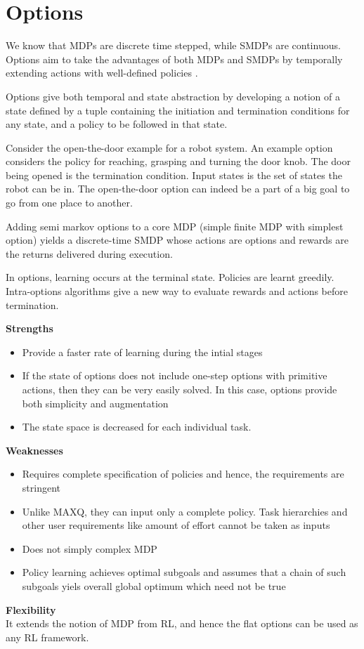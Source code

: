 \section{Options}

We know that MDPs are discrete time stepped, while SMDPs are continuous.
Options aim to take the advantages of both MDPs and SMDPs by temporally
extending actions with well-defined policies \cite{Sutton}.

Options give both temporal and state abstraction by developing a notion of a
state defined by a tuple containing the initiation and termination
conditions for any state, and a policy to be followed in that state.

Consider the open-the-door example for a robot system. An example option considers
the policy for reaching, grasping and turning the door knob. The door being
opened is the termination condition. Input states is the set of states the
robot can be in. The open-the-door option can indeed be a part of a big goal to
go from one place to another.

Adding semi markov options to a core MDP (simple finite MDP with simplest option) yields a
discrete-time SMDP whose actions are options and rewards are the returns
delivered during execution.

In options, learning occurs at the terminal state. Policies are learnt
greedily. Intra-options algorithms give a new way to evaluate rewards and
actions before termination.

\textbf{Strengths}
\begin{itemize}
    \item Provide a faster rate of learning during the intial stages
    \item If the state of options does not include one-step options with primitive actions, then they can be very easily solved. In this case, options provide both simplicity and augmentation
    \item The state space is decreased for each individual task.
\end{itemize}

\textbf{Weaknesses}
\begin{itemize}
    \item Requires complete specification of policies and hence, the requirements are stringent
    \item Unlike MAXQ, they can input only a complete policy. Task hierarchies and other user requirements like amount of effort cannot be taken as inputs
    \item Does not simply complex MDP
    \item Policy learning achieves optimal subgoals and assumes that a chain of such subgoals yiels overall global optimum which need not be true
\end{itemize}

\textbf{Flexibility} \\
It extends the notion of MDP from RL, and hence the flat options can be used as any RL framework.
